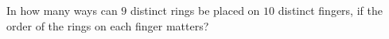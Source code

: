 In how many ways can $9$ distinct rings be placed on $10$ distinct fingers, if the order of the rings on each finger matters?
